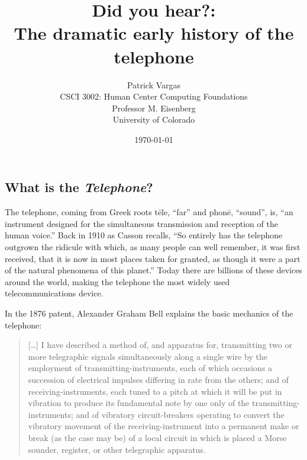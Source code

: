 \documentclass[12pt singlecol]{article}
\begin{document}
\title{Did you hear?:\\The dramatic early history of the telephone}
\author{Patrick Vargas \\CSCI 3002: Human Center Computing Foundations\\Professor M. Eisenberg\\University of Colorado}
\date{\today}

\thispagestyle{plain}
\maketitle
\newpage

\begin{flushleft}

\setlength{\parindent}{0.5in}

\begin{multicols}{2}
\section{What is the \emph{Telephone}?}

The telephone, coming from Greek roots t\={e}le, ``far'' and phon\={e}, ``sound'', is, ``an instrument designed for the simultaneous transmission and reception of the human voice.'' \cite[para.~1]{Encyc13} Back in 1910 as Casson recalls, ``So entirely has the telephone outgrown the ridicule with which, as many people can well remember, it was first received, that it is now in most places taken for granted, as though it were a part of the natural phenomena of this planet.'' \cite[p.~vi]{Casson10} Today there are billions of these devices around the world, making the telephone the most widely used telecommunications device. \cite[para.~1]{Encyc13}

In the 1876 patent, Alexander Graham Bell explains the basic mechanics of the telephone:
\begin{quotation}
[\ldots] I have described a method of, and apparatus for, transmitting two or more telegraphic signals simultaneously along a single wire by the employment of transmitting-instruments, each of which occasions a succession of electrical impulses differing in rate from the others; and of receiving-instruments, each tuned to a pitch at which it will be put in vibration to produce its fundamental note by one only of the transmitting-instruments; and of vibratory circuit-breakers operating to convert the vibratory movement of the receiving-instrument into a permanent make or break (as the case may be) of a local circuit in which is placed a Morse sounder, register, or other telegraphic apparatus.\cite[p.~1]{Bell76}
\end{quotation}


\end{multicols}
\end{flushleft}
\end{document}
